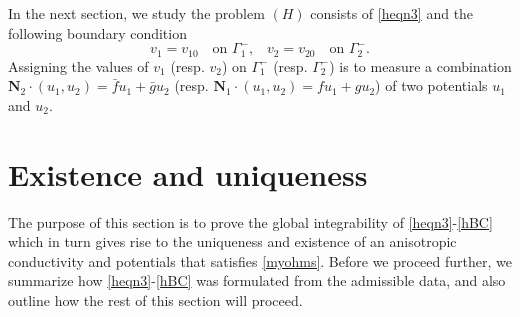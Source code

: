 \documentclass[11pt]{amsart}
\theoremstyle{plain}
\theoremstyle{remark}
\numberwithin{equation}{section}
\numberwithin{Thm}{section}
\def\N{{\mathbf N}}
\def\r{{\bf r}}
\def\r{\mbox{\boldmath$r$}}
\begin{document}
In the next section, we study the problem $(H)$ consists of \eqref{heqn3} and the following boundary condition 
\begin{equation} \label{hBC}
v_1 = v_{10} \quad \text{on $\Gamma_1^-$,} \quad v_2 = v_{20} \quad \text{on $\Gamma_2^-$}.
\end{equation}
Assigning the values of $v_1$ (resp. $v_2$) on $\Gamma^-_1$ (resp. $\Gamma^-_2$) is to measure a combination $\N_2\cdot(u_1,u_2)=\bar{{f}}u_1 + \bar{g} u_2$ (resp. $\N_1\cdot(u_1,u_2)={{f}}u_1 + {g} u_2$) of two potentials $u_1$ and $u_2$. %
% 
% 

\section{Existence and uniqueness}\label{sect.EU}


The purpose of this section is to prove the global integrability of \eqref{heqn3}-\eqref{hBC} which in turn gives rise to the uniqueness and existence of an anisotropic conductivity  and potentials that satisfies \eqref{myohms}. Before we proceed further, we summarize how \eqref{heqn3}-\eqref{hBC} was formulated from the admissible data, and also outline how the rest of this section will proceed.
\end{document}

